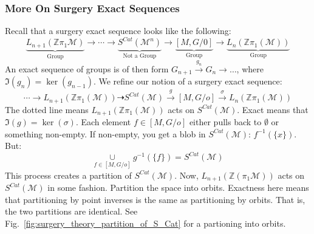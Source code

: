 \documentclass[oneside]{book}
\theoremstyle{mystyle}
\begin{document}
\subsubsection{More On Surgery Exact Sequences}
Recall that a surgery exact sequence looks like the following:
\begin{equation*}
    \underset{\textrm{Group}}{\underbrace{L_{n+1}(\mathbb{Z}\pi_{1}\mathcal{M})}} \rightarrow \cdots \rightarrow \underset{\textrm{Not a Group}}{\underbrace{S^{Cat}(\mathcal{M}^{n})}} \rightarrow \underset{\textrm{Group}}{\underbrace{[M,G/0]}} \rightarrow \underset{\textrm{Group}}{\underbrace{L_{n}(\mathbb{Z}\pi_{1}(\mathcal{M}))}} 
\end{equation*}
An exact sequence of groups is of then form $G_{n+1}\overset{g_{n}}{\rightarrow} G_{n}\rightarrow \hdots$, where $\Im(g_n) = \ker(g_{n-1})$. We refine our notion of a surgery exact sequence:
\begin{equation*}
    \cdots \rightarrow L_{n+1}(\mathbb{Z}\pi_{1}(\mathcal{M})) \dashrightarrow S^{Cat}(\mathcal{M}) \overset{g}{\rightarrow} [M,G/o] \overset{\sigma}{\rightarrow} L_{n}(\mathbb{Z}\pi_{1}(\mathcal{M}))
\end{equation*}
The dotted line means $L_{n+1}(\mathbb{Z}\pi_{1}(\mathcal{M}))$ acts on $S^{Cat}(\mathcal{M})$. Exact means that $\Im(g) = \ker(\sigma)$. Each element $f\in [M,G/o]$ either pulls back to $\emptyset$ or something non-empty. If non-empty, you get a blob in $S^{Cat}(\mathcal{M})$: $f^{-1}(\{x\})$. But:
\begin{equation*}
    \underset{f\in [M,G/o]}{\cup}g^{-1}(\{f\}) = S^{Cat}(\mathcal{M})
\end{equation*}
This process creates a partition of $S^{Cat}(\mathcal{M})$. Now, $L_{n+1}(\mathbb{Z}(\pi_{1}\mathcal{M}))$ acts on $S^{Cat}(\mathcal{M})$ in some fashion. Partition the space into orbits. Exactness here means that partitioning by point inverses is the same as partitioning by orbits. That is, the two partitions are identical. See Fig.~\ref{fig:surgery_theory_partition_of_S_Cat} for a partioning into orbits.
\end{document}
